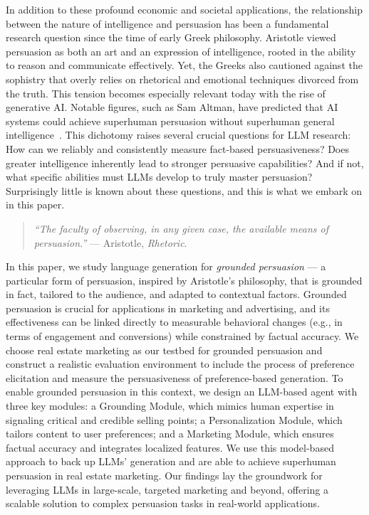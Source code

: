 In addition to these profound economic and societal applications, the relationship between the nature of intelligence and persuasion has been a fundamental research question since the time of early Greek philosophy. Aristotle viewed persuasion as both an art and an expression of intelligence, rooted in the ability to reason and communicate effectively. Yet, the Greeks also cautioned against the sophistry that overly relies on rhetorical and emotional techniques divorced from the truth. This tension becomes especially relevant today with the rise of generative AI.
Notable figures, such as Sam Altman, have predicted that AI systems could achieve superhuman persuasion without superhuman general intelligence~\citep{altman_2023}. This dichotomy raises several crucial questions for LLM research: How can we reliably and consistently measure fact-based persuasiveness? Does greater intelligence inherently lead to stronger persuasive capabilities? And if not, what specific abilities must LLMs develop to truly master persuasion? 
Surprisingly little is known about these questions, and this is what we embark on in this paper.
\begin{quote}
    \textit{``The faculty of observing, in any given case, the available means of persuasion.''} 
    \newline
    \mbox{}\hfill --- Aristotle, \textit{Rhetoric}. 
\end{quote}
In this paper, we study language generation for \emph{grounded persuasion}  --- a particular form of persuasion, inspired by Aristotle’s philosophy, that is grounded in fact, tailored to the audience, and adapted to contextual factors. Grounded persuasion is crucial for applications in marketing and advertising, and its effectiveness can be linked directly to measurable behavioral changes (e.g., in terms of engagement and conversions) while constrained by factual accuracy.
We choose real estate marketing as our testbed for grounded persuasion and construct a realistic evaluation environment to include the process of preference elicitation and measure the persuasiveness of preference-based generation. To enable grounded persuasion in this context, we design an LLM-based agent with three key modules: a Grounding Module, which mimics human expertise in signaling critical and credible selling points; a Personalization Module, which tailors content to user preferences; and a Marketing Module, which ensures factual accuracy and integrates localized features. We use this model-based approach to back up LLMs'  generation and are able to achieve superhuman persuasion in real estate marketing. Our findings lay the groundwork for leveraging LLMs in large-scale, targeted marketing and beyond, offering a scalable solution to complex persuasion tasks in real-world applications.

